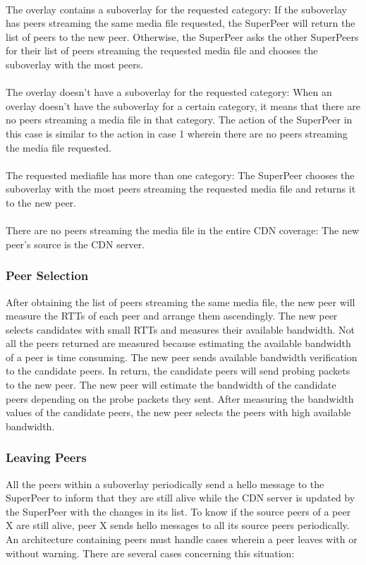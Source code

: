 \documentclass[letterpaper, twocolumn, twoside]{IEEEtran}
\begin{document}
\paragraph{}
The overlay contains a suboverlay for the requested category: If the suboverlay has peers streaming the same media file requested, the SuperPeer will return the list of peers to the new peer. Otherwise, the SuperPeer asks the other SuperPeers for their list of peers streaming the requested media file and chooses the suboverlay with the most peers.
\paragraph{}
The overlay doesn’t have a suboverlay for the requested category: When an overlay doesn’t have the suboverlay for a certain category, it means that there are no peers streaming a media file in that category. The action of the SuperPeer in this case is similar to the action in case 1 wherein there are no peers streaming the media file requested.
\paragraph{}
The requested mediafile has more than one category: The SuperPeer chooses the suboverlay with the most peers streaming the requested media file and returns it to the new peer.
\paragraph{}
There are no peers streaming the media file in the entire CDN coverage: The new peer’s source is the CDN server.
\subsubsection{Peer Selection}
After obtaining the list of peers streaming the same media file, the new peer will measure the RTTs of each peer and arrange them ascendingly. The new peer selects candidates with small RTTs and measures their available bandwidth. Not all the peers returned are measured because estimating the available bandwidth of a peer is time consuming. The new peer sends available bandwidth verification to the candidate peers. In return, the candidate peers will send probing packets to the new peer. The new peer will estimate the bandwidth of the candidate peers depending on the probe packets they sent. After measuring the bandwidth values of the candidate peers, the new peer selects the peers with high available bandwidth.
\subsubsection{Leaving Peers}
All the peers within a suboverlay periodically send a hello message to the SuperPeer to inform that they are still alive while the CDN server is updated by the SuperPeer with the changes in its list. To know if the source peers of a peer X are still alive, peer X sends hello messages to all its source peers periodically. An architecture containing peers must handle cases wherein a peer leaves with or without warning. There are several cases concerning this situation:
\end{document}
